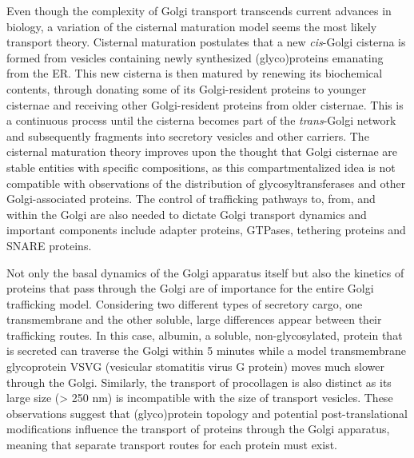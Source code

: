 Even though the complexity of Golgi transport transcends current advances in biology, a variation of the cisternal maturation model seems the most likely transport theory\cite{glick_membrane_2009,glick_models_2011,pantazopoulou_kinetic_2019}. Cisternal maturation postulates that a new \emph{cis}-Golgi cisterna is formed from vesicles containing newly synthesized (glyco)proteins emanating from the ER. This new cisterna is then matured by renewing its biochemical contents, through donating some of its Golgi-resident proteins to younger cisternae and receiving other Golgi-resident proteins from older cisternae. This is a continuous process until the cisterna becomes part of the \emph{trans}-Golgi network and subsequently fragments into secretory vesicles and other carriers\cite{glick_membrane_2009,glick_models_2011,pantazopoulou_kinetic_2019}. The cisternal maturation theory improves upon the thought that Golgi cisternae are stable entities with specific compositions, as this compartmentalized idea is not compatible with observations of the distribution of glycosyltransferases and other Golgi-associated proteins\cite{velasco_cell_1993,pantazopoulou_kinetic_2019,nilsson_kin_1993,rabouille_mapping_1995,harris_localization_1996,munro_what_2001}. The control of trafficking pathways to, from, and within the Golgi are also needed to dictate Golgi transport dynamics\cite{pantazopoulou_kinetic_2019} and important components include adapter proteins\cite{pantazopoulou_kinetic_2019}, GTPases\cite{mizuno-yamasaki_gtpase_2012}, tethering proteins\cite{witkos_golgin_2016,wong_membrane_2014} and SNARE proteins\cite{malsam_organization_2011}.

Not only the basal dynamics of the Golgi apparatus itself but also the kinetics of proteins that pass through the Golgi are of importance for the entire Golgi trafficking model. Considering two different types of secretory cargo, one transmembrane and the other soluble, large differences appear between their trafficking routes\cite{beznoussenko_transport_2014}. In this case, albumin, a soluble, non-glycosylated, protein that is secreted can traverse the Golgi within 5 minutes while a model transmembrane glycoprotein VSVG (vesicular stomatitis virus G protein) moves much slower through the Golgi\cite{beznoussenko_transport_2014}. Similarly, the transport of procollagen is also distinct as its large size (> 250 nm) is incompatible with the size of transport vesicles\cite{beznoussenko_transport_2014,mccaughey_er--golgi_2018}. These observations suggest that (glyco)protein topology and potential post-translational modifications influence the transport of proteins through the Golgi apparatus, meaning that separate transport routes for each protein must exist. 

